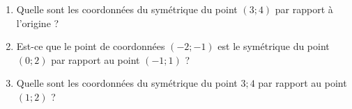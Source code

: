 
\begin{exercice}\label{exosmath-0476}

    \begin{enumerate}
        \item
            Quelle sont les coordonnées du symétrique du point \( (3;4)\) par rapport à l'origine ?
        \item
            Est-ce que le point de coordonnées \( (-2;-1)\) est le symétrique du point \( (0;2)\) par rapport au point \( (-1;1)\) ?
        \item
            Quelle sont les coordonnées du symétrique du point \( 3;4\) par rapport au point \( (1;2)\) ?
    \end{enumerate}
     
\end{exercice}
